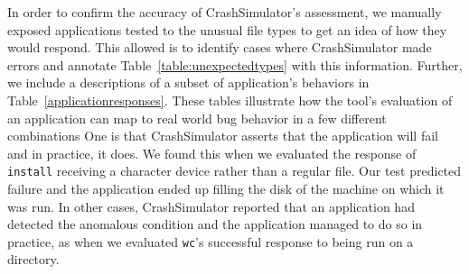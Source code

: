 \begin{table}[t]
    \scriptsize{}
    \caption{Responses of a sample of coreutils applications when exposed to
      anomalous conditions.  The character device used was the infinite-length {\tt
        /dev/urandom}.}
    \label{table:applicationresponses}
\end{table}

In order to confirm the accuracy of CrashSimulator's assessment, we manually
exposed applications tested to the unusual
file types to get an idea of how they would respond.
This allowed is to identify cases where CrashSimulator made errors and
annotate Table~\ref{table:unexpectedtypes} with this information.  Further,
we include a descriptions of a subset of application's behaviors in
Table~\ref{applicationresponses}.
These tables illustrate how the tool's
evaluation of an application can map to real world bug behavior
in a few different combinations
One is that CrashSimulator asserts that the application will fail
and in practice, it does.  We found this when we evaluated
the response of  {\tt install} receiving a character device
rather than a regular file. Our test predicted failure and the
application ended up filling the disk of the machine on which it was run.
In other cases, CrashSimulator reported that an
application had detected the anomalous condition and the application managed to
do so in practice,  as when we evaluated {\tt wc}'s successful response to
being run on a directory.

